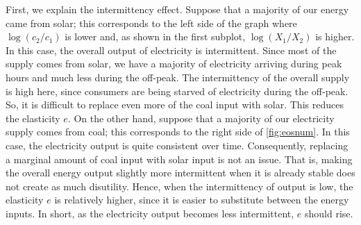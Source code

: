 \documentclass[11pt,a4paper,leqno]{extarticle}
\begin{document}
	First, we explain the intermittency effect.  Suppose that a majority of our energy came from solar; this corresponds to the left side of the graph where $\log(c_2/c_1)$ is lower and, as shown in the  first subplot, $\log(X_1/X_2)$ is higher. In this case, the overall output of electricity is intermittent. Since most of the supply comes from solar, we have a majority of electricity arriving during peak hours and much less during the off-peak. The intermittency of the overall supply is high here, since consumers are being starved of electricity during the off-peak. So, it is difficult to replace even more of the coal input with solar. This reduces the elasticity $e$. On the other hand, suppose that a majority of our electricity supply comes from coal; this corresponds to the right side of \autoref{fig:eosnum}. In this case, the electricity output is quite consistent over time. Consequently, replacing a marginal amount of coal input with solar input is not an issue. That is, making the overall energy output slightly more intermittent when it is already stable does not create as much disutility.  Hence, when the intermittency of output is low, the elasticity $e$ is relatively higher, since it is easier to substitute between the energy inputs.  In short, as the electricity output becomes less intermittent, $e$ should rise. 
	
\end{document}

